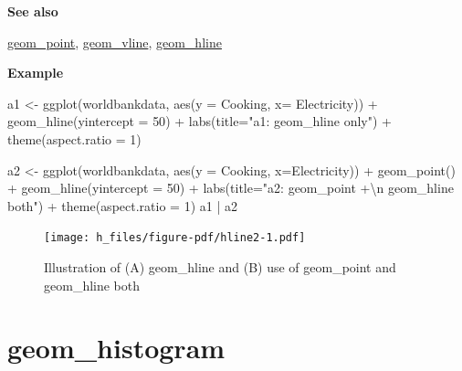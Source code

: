\documentclass[
  letterpaper,
  DIV=11,
  numbers=noendperiod]{scrreprt}
\newenvironment{Shaded}{\begin{snugshade}}{\end{snugshade}}
\newcommand{\AttributeTok}[1]{\textcolor[rgb]{0.40,0.45,0.13}{#1}}
\newcommand{\DecValTok}[1]{\textcolor[rgb]{0.68,0.00,0.00}{#1}}
\newcommand{\FunctionTok}[1]{\textcolor[rgb]{0.28,0.35,0.67}{#1}}
\newcommand{\NormalTok}[1]{\textcolor[rgb]{0.00,0.23,0.31}{#1}}
\newcommand{\OtherTok}[1]{\textcolor[rgb]{0.00,0.23,0.31}{#1}}
\newcommand{\SpecialCharTok}[1]{\textcolor[rgb]{0.37,0.37,0.37}{#1}}
\newcommand{\StringTok}[1]{\textcolor[rgb]{0.13,0.47,0.30}{#1}}
\begin{document}
\textbf{See also}

\hyperref[point]{geom\_point}, \hyperref[vline]{geom\_vline},
\hyperref[hline]{geom\_hline}

\textbf{Example}

\begin{Shaded}
\begin{Highlighting}[]
\NormalTok{a1 }\OtherTok{\textless{}{-}} \FunctionTok{ggplot}\NormalTok{(worldbankdata, }\FunctionTok{aes}\NormalTok{(}\AttributeTok{y =}\NormalTok{ Cooking, }\AttributeTok{x=}\NormalTok{ Electricity)) }\SpecialCharTok{+} \FunctionTok{geom\_hline}\NormalTok{(}\AttributeTok{yintercept =} \DecValTok{50}\NormalTok{) }\SpecialCharTok{+} 
  \FunctionTok{labs}\NormalTok{(}\AttributeTok{title=}\StringTok{"a1: \textasciigrave{}geom\_hline\textasciigrave{} only"}\NormalTok{) }\SpecialCharTok{+}
  \FunctionTok{theme}\NormalTok{(}\AttributeTok{aspect.ratio =} \DecValTok{1}\NormalTok{)}

\NormalTok{a2 }\OtherTok{\textless{}{-}} \FunctionTok{ggplot}\NormalTok{(worldbankdata, }\FunctionTok{aes}\NormalTok{(}\AttributeTok{y =}\NormalTok{ Cooking, }\AttributeTok{x=}\NormalTok{Electricity)) }\SpecialCharTok{+} 
  \FunctionTok{geom\_point}\NormalTok{() }\SpecialCharTok{+} 
  \FunctionTok{geom\_hline}\NormalTok{(}\AttributeTok{yintercept =} \DecValTok{50}\NormalTok{) }\SpecialCharTok{+} 
  \FunctionTok{labs}\NormalTok{(}\AttributeTok{title=}\StringTok{"a2: \textasciigrave{}geom\_point +}\SpecialCharTok{\textbackslash{}n}\StringTok{ geom\_hline\textasciigrave{} both"}\NormalTok{) }\SpecialCharTok{+}
  \FunctionTok{theme}\NormalTok{(}\AttributeTok{aspect.ratio =} \DecValTok{1}\NormalTok{)}
\NormalTok{a1 }\SpecialCharTok{|}\NormalTok{ a2}
\end{Highlighting}
\end{Shaded}

\begin{figure}[H]

{\centering \texttt{[image: h\_files/figure-pdf/hline2-1.pdf]}

}

\caption{Illustration of (A) geom\_hline and (B) use of geom\_point and
geom\_hline both}

\end{figure}%

\section{geom\_histogram}\label{histogram}
\end{document}

